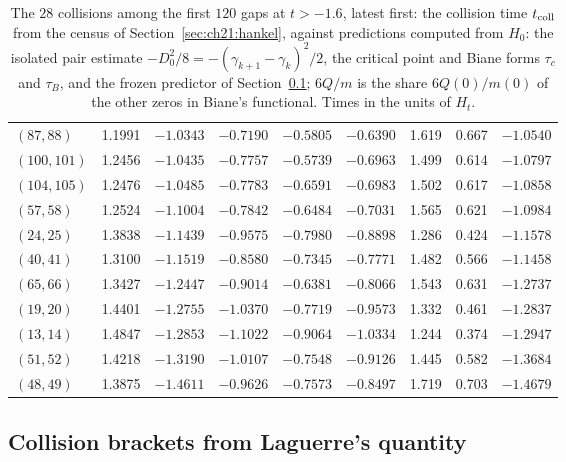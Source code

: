 \begin{table}[htbp]
\begin{tabular}{lcccccccc}
$(87,88)$ & 1.1991 & $-1.0343$ & $-0.7190$ & $-0.5805$ & $-0.6390$ & 1.619 & 0.667 & $-1.0540$\\
$(100,101)$ & 1.2456 & $-1.0435$ & $-0.7757$ & $-0.5739$ & $-0.6963$ & 1.499 & 0.614 & $-1.0797$\\
$(104,105)$ & 1.2476 & $-1.0485$ & $-0.7783$ & $-0.6591$ & $-0.6983$ & 1.502 & 0.617 & $-1.0858$\\
$(57,58)$ & 1.2524 & $-1.1004$ & $-0.7842$ & $-0.6484$ & $-0.7031$ & 1.565 & 0.621 & $-1.0984$\\
$(24,25)$ & 1.3838 & $-1.1439$ & $-0.9575$ & $-0.7980$ & $-0.8898$ & 1.286 & 0.424 & $-1.1578$\\
$(40,41)$ & 1.3100 & $-1.1519$ & $-0.8580$ & $-0.7345$ & $-0.7771$ & 1.482 & 0.566 & $-1.1458$\\
$(65,66)$ & 1.3427 & $-1.2447$ & $-0.9014$ & $-0.6381$ & $-0.8066$ & 1.543 & 0.631 & $-1.2737$\\
$(19,20)$ & 1.4401 & $-1.2755$ & $-1.0370$ & $-0.7719$ & $-0.9573$ & 1.332 & 0.461 & $-1.2837$\\
$(13,14)$ & 1.4847 & $-1.2853$ & $-1.1022$ & $-0.9064$ & $-1.0334$ & 1.244 & 0.374 & $-1.2947$\\
$(51,52)$ & 1.4218 & $-1.3190$ & $-1.0107$ & $-0.7548$ & $-0.9126$ & 1.445 & 0.582 & $-1.3684$\\
$(48,49)$ & 1.3875 & $-1.4611$ & $-0.9626$ & $-0.7573$ & $-0.8497$ & 1.719 & 0.703 & $-1.4679$\\
\bottomrule
\end{tabular}
\caption{The $28$ collisions among the first $120$ gaps at $t>-1.6$, latest first: the collision time $t_{\rm coll}$ from the census of Section~\ref{sec:ch21:hankel}, against predictions computed from $H_0$: the isolated pair estimate $-D_0^2/8=-(\gamma_{k+1}-\gamma_k)^2/2$, the critical point and Biane forms $\tau_c$ and $\tau_B$, and the frozen predictor of Section~\ref{sec:wigbiane:brackets}; $6Q/m$ is the share $6Q(0)/m(0)$ of the other zeros in Biane's functional. Times in the units of $H_t$.}
\label{tab:wigbiane:coll}
\end{table}

\subsection{Collision brackets from Laguerre's quantity}\label{sec:wigbiane:brackets}

